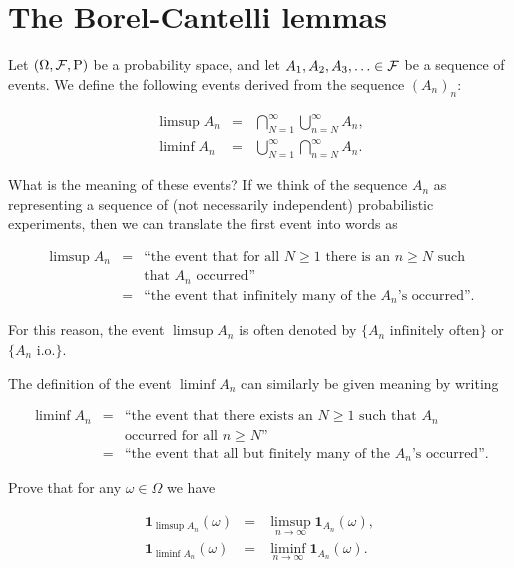 \chapter{The Borel-Cantelli lemmas}

Let $(\Omega, {\cal F}, \mathrm{P})$ be a probability
space, and let $A_1, A_2, A_3, \ldots \in {\cal F}$
be a sequence of events. We define the following
events derived from the sequence $(A_n)_n$:

\begin{eqnarray*}
\limsup A_n &=& \bigcap_{N=1}^\infty \bigcup_{n=N}^\infty A_n, \\
\liminf A_n &=& \bigcup_{N=1}^\infty \bigcap_{n=N}^\infty A_n.
\end{eqnarray*}

\noindent What is the meaning of these events? If we think of
the sequence $A_n$ as representing a sequence of (not
necessarily independent) probabilistic experiments,
then we can translate the first event into words as

\begin{eqnarray*}
\limsup A_n &=& \textrm{``the event that for all $N\ge 1$ there is an $n\ge N$ such} \\
&  & \textrm{that $A_n$ occurred''} \\ &=& \textrm{``the event that infinitely many of the $A_n$'s occurred''.}
\end{eqnarray*}

\noindent For this reason, the event $\limsup A_n$ is often
denoted by $\{ A_n\textrm{ infinitely often}\}$ or
$\{A_n \textrm{ i.o.}\}$.

The definition of the event $\liminf A_n$ can
similarly be given meaning by writing

\begin{eqnarray*}
\liminf A_n &=& \textrm{``the event that there exists an $N\ge 1$ such that $A_n$ } \\
&  & \textrm{occurred for all $n\ge N$''} \\ &=& \textrm{``the event that all but finitely many of the $A_n$'s occurred''.}
\end{eqnarray*}

\begin{xexercise}
Prove that for any $\omega \in \Omega$ we have

\begin{eqnarray*}
\mathbf{1}_{\limsup A_n}(\omega) &=& \limsup_{n\to\infty} \mathbf{1}_{A_n}(\omega), \\
\mathbf{1}_{\liminf A_n}(\omega) &=& \liminf_{n\to\infty} \mathbf{1}_{A_n}(\omega).
\end{eqnarray*}

\end{xexercise}

